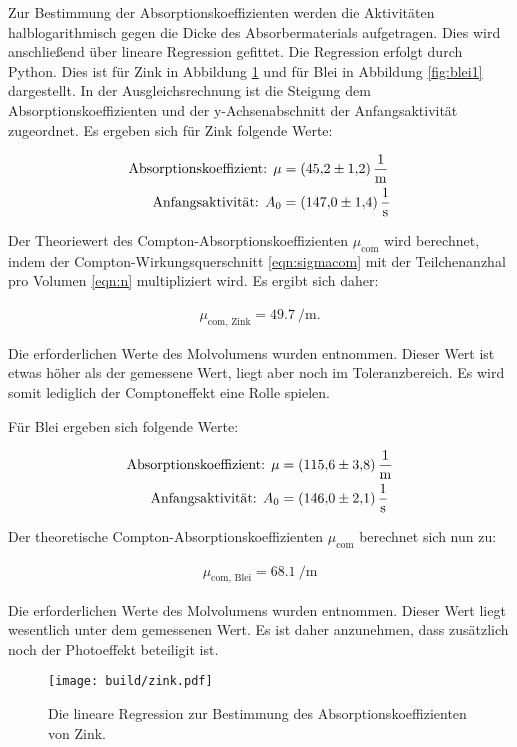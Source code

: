 Zur Bestimmung der Absorptionskoeffizienten werden die Aktivitäten halblogarithmisch gegen die Dicke des Absorbermaterials aufgetragen.
Dies wird anschließend über lineare Regression gefittet.
Die Regression erfolgt durch Python.
Dies ist für Zink in Abbildung \ref{fig:zink1} und für Blei in Abbildung \ref{fig:blei1} dargestellt.
In der Ausgleichsrechnung ist die Steigung dem Absorptionskoeffizienten und der y-Achsenabschnitt der Anfangsaktivität zugeordnet.
Es ergeben sich für Zink folgende Werte:

\begin{align*}
  \text{Absorptionskoeffizient: } \mu &= \SI{45.2 \pm 1.2}{\per\metre} \\
  \text{Anfangsaktivität: } A_0 &= \SI{147.0 \pm 1.4}{\per\second}
\end{align*}

Der Theoriewert des Compton-Absorptionskoeffizienten $\mu_\text{com}$ wird berechnet, indem der Compton-Wirkungsquerschnitt \ref{eqn:sigmacom} mit der Teilchenanzhal pro Volumen \ref{eqn:n} multipliziert wird.
Es ergibt sich daher:

\begin{align*}
  \mu_\text{com, Zink} = \SI{49.7}{\per\metre}.
\end{align*}

Die erforderlichen Werte des Molvolumens wurden \cite{zink} entnommen.
Dieser Wert ist etwas höher als der gemessene Wert, liegt aber noch im Toleranzbereich.
Es wird somit lediglich der Comptoneffekt eine Rolle spielen.

Für Blei ergeben sich folgende Werte:

\begin{align*}
  \text{Absorptionskoeffizient: } \mu &= \SI{115.6 \pm 3.8}{\per\metre} \\
  \text{Anfangsaktivität: } A_0 &= \SI{146.0 \pm 2.1}{\per\second}
\end{align*}

Der theoretische Compton-Absorptionskoeffizienten $\mu_\text{com}$ berechnet sich nun zu:

\begin{align*}
  \mu_\text{com, Blei} = \SI{68.1}{\per\metre}
\end{align*}

Die erforderlichen Werte des Molvolumens wurden \cite{blei} entnommen.
Dieser Wert liegt wesentlich unter dem gemessenen Wert.
Es ist daher anzunehmen, dass zusätzlich noch der Photoeffekt beteiligit ist.

\begin{figure}
  \centering
  \texttt{[image: build/zink.pdf]}
  \caption{Die lineare Regression zur Bestimmung des Absorptionskoeffizienten von Zink.}
  \label{fig:zink1}
\end{figure}

